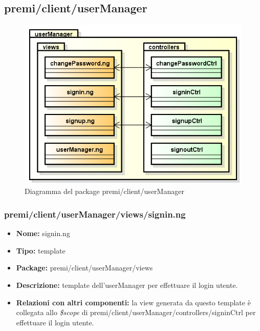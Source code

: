 \subsection{premi/client/userManager}
\begin{figure}[H]
\begin{center}
\includegraphics[scale=0.45]{img/diapkg/userManager.png}
\caption{Diagramma del package premi/client/userManager}
\end{center}
\end{figure}

\subsubsection{premi/client/userManager/views/signin.ng}
\begin{itemize}
  \item[] \textbf{Nome:} signin.ng
  \item[] \textbf{Tipo:} template
  \item[] \textbf{Package:} premi/client/userManager/views
  \item[] \textbf{Descrizione:} template dell'userManager per effettuare il login utente.
  \item[] \textbf{Relazioni con altri componenti:} la view generata da questo template è collegata allo \textit{\$scope} di premi/client/userManager/controllers/signinCtrl per effettuare il login utente.
\end{itemize}

